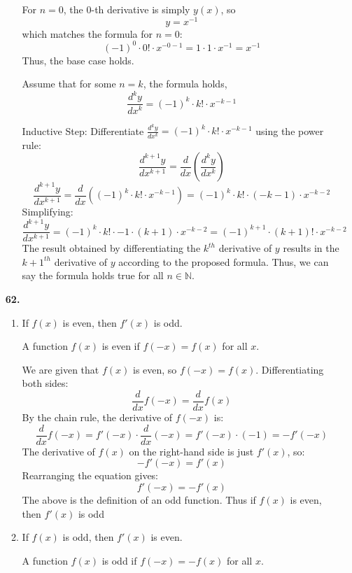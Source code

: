 \documentclass[12pt]{article}
\begin{document}
\begin{enumerate}[start=1,label={\bfseries. },leftmargin=1in]
\begin{enumerate}
    For \( n = 0 \), the \( 0 \)-th derivative is simply \( y(x) \), so
    \[
    y = x^{-1}
    \]
    which matches the formula for \( n = 0 \):
    \[
    (-1)^0 \cdot 0! \cdot x^{-0-1} = 1 \cdot 1 \cdot x^{-1} = x^{-1}
    \]
    Thus, the base case holds.

    Assume that for some \( n = k \), the formula holds,
    \[
    \frac{d^ky}{dx^k} = (-1)^k \cdot k! \cdot x^{-k-1}
    \]

 Inductive Step: Differentiate \( \frac{d^ky}{dx^k} = (-1)^k \cdot k! \cdot x^{-k-1} \) using the power rule:
    \[
    \frac{d^{k+1}y}{dx^{k+1}} = \frac{d}{dx}\left(\frac{d^{k}y}{dx^{k}}\right)
    \]
    \[
    \frac{d^{k+1}y}{dx^{k+1}}= \frac{d}{dx} \left( (-1)^k \cdot k! \cdot x^{-k-1} \right) = (-1)^k \cdot k! \cdot (-k-1) \cdot x^{-k-2}
    \]
    Simplifying:
    \[
    \frac{d^{k+1}y}{dx^{k+1}}= (-1)^k \cdot k! \cdot -1\cdot(k+1) \cdot x^{-k-2} = (-1)^{k+1} \cdot (k+1)! \cdot x^{-k-2}
    \]
    The result obtained by differentiating the $k^{th}$ derivative of $y$ results in the $k+1^{th}$ derivative of $y$ according to the proposed formula. Thus, we can say the formula holds true for all $n\in \mathbb{N}$.
    \end{enumerate}

    \item [\textbf{62. }]
    \begin{enumerate}
    \item If \( f(x) \) is even, then \( f'(x) \) is odd.

    A function \( f(x) \) is even if \( f(-x) = f(x) \) for all \( x \).

    We are given that \( f(x) \) is even, so \( f(-x) = f(x) \). Differentiating both sides:
    \[
    \frac{d}{dx} f(-x) = \frac{d}{dx} f(x)
    \]
    By the chain rule, the derivative of \( f(-x) \) is:
    \[
    \frac{d}{dx} f(-x) = f'(-x) \cdot \frac{d}{dx}(-x) = f'(-x) \cdot (-1) = -f'(-x)
    \]
    The derivative of \( f(x) \) on the right-hand side is just \( f'(x) \), so:
    \[
    -f'(-x) = f'(x)
    \]
    Rearranging the equation gives:
    \[
    f'(-x) = -f'(x)
    \]
    The above is the definition of an odd function. Thus if $f(x)$ is even, then $f'(x)$ is odd
    \bigbreak

    \item If \( f(x) \) is odd, then \( f'(x) \) is even.

    A function \( f(x) \) is odd if \( f(-x) = -f(x) \) for all \( x \).


\end{enumerate}
\end{enumerate}
\end{document}
